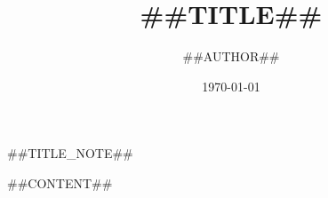 \documentclass[##CLASS_OPTIONS##]{ctexart} %
\title{##TITLE##}			%
\author{##AUTHOR##}			%
\date{\today}
\begin{document}
	\maketitle			%
	##TITLE_NOTE##		%

	\newpage
	\tableofcontents	%

	\newpage
	##CONTENT##			%
\end{document}
